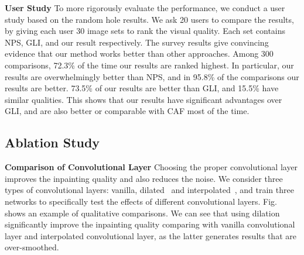 \noindent\textbf{User Study}
To more rigorously evaluate the performance, we conduct a user study based on the random hole results. We ask 20 users to compare the results, by giving each user 30 image sets to rank the visual quality. Each set contains NPS, GLI, and our result respectively. The survey results give convincing evidence that our method works better than other approaches. Among 300 comparisons, 72.3\% of the time our results are ranked highest. In particular, our results are overwhelmingly better than NPS, and in 95.8\% of the comparisons our results are better. 73.5\% of our results are better than GLI, and 15.5\% have similar qualities. This shows that our results have significant advantages over GLI, and are also better or comparable with CAF most of the time.

\subsection{Ablation Study}
\label{exp:study}

\noindent\textbf{Comparison of Convolutional Layer} Choosing the proper convolutional layer improves the inpainting quality and also reduces the noise. We consider three types of convolutional layers: vanilla, dilated~\cite{yu2015multi} and interpolated~\cite{odena2016deconvolution}, and train three networks to specifically test the effects of different convolutional layers. Fig. shows an example of qualitative comparisons. We can see that using dilation significantly improve the inpainting quality comparing with vanilla convolutional layer and interpolated convolutional layer, as the latter generates results that are over-smoothed.  

